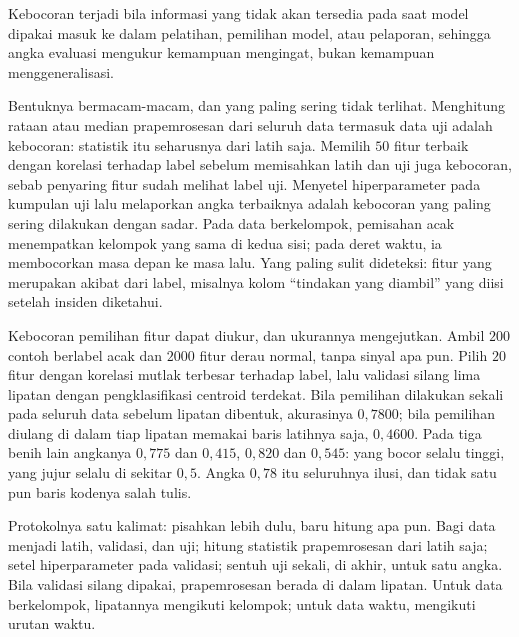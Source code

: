 
\begin{definisi}
Kebocoran terjadi bila informasi yang tidak akan tersedia pada saat model dipakai masuk
ke dalam pelatihan, pemilihan model, atau pelaporan, sehingga angka evaluasi mengukur
kemampuan mengingat, bukan kemampuan menggeneralisasi.
\end{definisi}

Bentuknya bermacam-macam, dan yang paling sering tidak terlihat. Menghitung rataan
atau median prapemrosesan dari seluruh data termasuk data uji adalah kebocoran:
statistik itu seharusnya dari latih saja. Memilih $50$ fitur terbaik dengan korelasi
terhadap label sebelum memisahkan latih dan uji juga kebocoran, sebab penyaring
fitur sudah melihat label uji. Menyetel hiperparameter pada kumpulan uji lalu
melaporkan angka terbaiknya adalah kebocoran yang paling sering dilakukan dengan
sadar. Pada data berkelompok, pemisahan acak menempatkan kelompok yang sama di kedua
sisi; pada deret waktu, ia membocorkan masa depan ke masa lalu. Yang paling sulit
dideteksi: fitur yang merupakan akibat dari label, misalnya kolom ``tindakan yang
diambil'' yang diisi setelah insiden diketahui.

Kebocoran pemilihan fitur dapat diukur, dan ukurannya mengejutkan. Ambil $200$ contoh
berlabel acak dan $2000$ fitur derau normal, tanpa sinyal apa pun. Pilih $20$ fitur dengan
korelasi mutlak terbesar terhadap label, lalu validasi silang lima lipatan dengan
pengklasifikasi centroid terdekat. Bila pemilihan
dilakukan sekali pada seluruh data sebelum lipatan dibentuk, akurasinya $0{,}7800$; bila
pemilihan diulang di dalam tiap lipatan memakai baris latihnya saja, $0{,}4600$. Pada tiga
benih lain angkanya $0{,}775$ dan $0{,}415$, $0{,}820$ dan $0{,}545$: yang bocor selalu
tinggi, yang jujur selalu di sekitar $0{,}5$. Angka $0{,}78$ itu seluruhnya ilusi, dan
tidak satu pun baris kodenya salah tulis.

Protokolnya satu kalimat: pisahkan lebih dulu, baru hitung apa pun. Bagi data
menjadi latih, validasi, dan uji; hitung statistik prapemrosesan dari latih saja;
setel hiperparameter pada validasi; sentuh uji sekali, di akhir, untuk satu angka.
Bila validasi silang dipakai, prapemrosesan berada di dalam lipatan. Untuk data
berkelompok, lipatannya mengikuti kelompok; untuk data waktu, mengikuti urutan
waktu.

